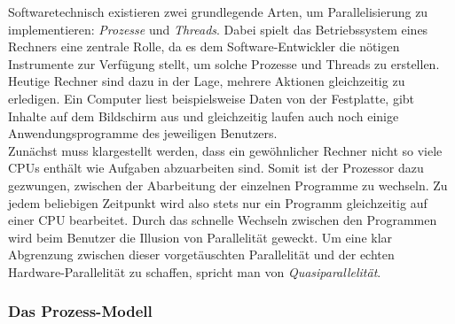 			Softwaretechnisch existieren zwei grundlegende Arten, um Parallelisierung zu implementieren: \textit{Prozesse} und \textit{Threads}.
			Dabei spielt das Betriebssystem eines Rechners eine zentrale Rolle, da es dem Software-Entwickler die nötigen Instrumente zur Verfügung stellt, um solche Prozesse und Threads zu erstellen.\\
			Heutige Rechner sind dazu in der Lage, mehrere Aktionen gleichzeitig zu erledigen. Ein Computer liest beispielsweise Daten von der Festplatte, gibt Inhalte auf dem Bildschirm aus und gleichzeitig laufen auch noch einige Anwendungsprogramme des jeweiligen Benutzers.\\
			Zunächst muss klargestellt werden, dass ein gewöhnlicher Rechner nicht so viele CPUs enthält wie Aufgaben abzuarbeiten sind. Somit ist der Prozessor dazu gezwungen, zwischen der Abarbeitung der einzelnen Programme zu wechseln. Zu jedem beliebigen Zeitpunkt wird also stets nur ein Programm gleichzeitig auf einer CPU bearbeitet. Durch das schnelle Wechseln zwischen den Programmen wird beim Benutzer die Illusion von Parallelität geweckt. Um eine klar Abgrenzung zwischen dieser vorgetäuschten Parallelität und der echten Hardware-Parallelität zu schaffen, spricht man von \textit{Quasiparallelität}. \cite{ModerneBetriebssysteme}
			
			\subsubsection{Das Prozess-Modell}
				\label{ProzessModell}
			
